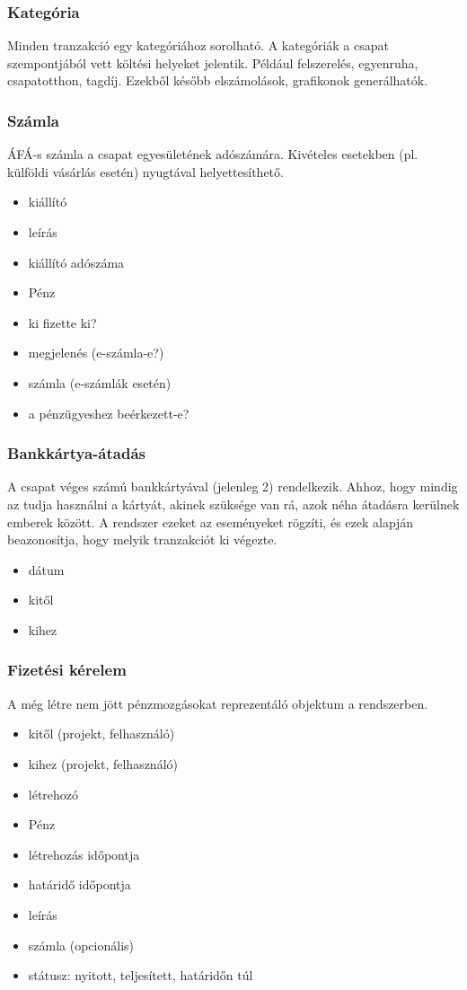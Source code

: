 \documentclass[a4paper,12pt]{article}
\begin{document}
\subsubsection{Kategória}
Minden tranzakció egy kategóriához sorolható. A kategóriák a csapat szempontjából vett költési helyeket jelentik. Például felszerelés, egyenruha, csapatotthon, tagdíj. Ezekből később elszámolások, grafikonok generálhatók.
\subsubsection{Számla}
ÁFÁ-s számla a csapat egyesületének adószámára. Kivételes esetekben (pl. külföldi vásárlás esetén) nyugtával helyettesíthető.
\begin{itemize}
  \item kiállító
  \item leírás
  \item kiállító adószáma
  \item Pénz
  \item ki fizette ki?
  \item megjelenés (e-számla-e?)
  \item számla (e-számlák esetén)
  \item a pénzügyeshez beérkezett-e?
\end{itemize}
\subsubsection{Bankkártya-átadás}
A csapat véges számú bankkártyával (jelenleg 2) rendelkezik. Ahhoz, hogy mindig az tudja használni a kártyát, akinek szüksége van rá, azok néha átadásra kerülnek emberek között. A rendszer ezeket az eseményeket rögzíti, és ezek alapján beazonosítja, hogy melyik tranzakciót ki végezte.
\begin{itemize}
  \item dátum
  \item kitől
  \item kihez
\end{itemize}
\subsubsection{Fizetési kérelem}
A még létre nem jött pénzmozgásokat reprezentáló objektum a rendszerben. 
\begin{itemize}
  \item kitől (projekt, felhasználó)
  \item kihez (projekt, felhasználó)
  \item létrehozó
  \item Pénz
  \item létrehozás időpontja
  \item határidő időpontja
  \item leírás
  \item számla (opcionális)
  \item státusz: nyitott, teljesített, határidőn túl
\end{itemize}
\end{document}
